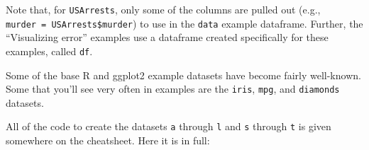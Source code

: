 \documentclass[]{book}
\makeatletter
\newenvironment{kframe}{%
\medskip{}
\setlength{\fboxsep}{.8em}
 \def\at@end@of@kframe{}%
 \ifinner\ifhmode%
  \def\at@end@of@kframe{\end{minipage}}%
  \begin{minipage}{\columnwidth}%
 \fi\fi%
 \def\FrameCommand##1{\hskip\@totalleftmargin \hskip-\fboxsep
 \colorbox{shadecolor}{##1}\hskip-\fboxsep
     \hskip-\linewidth \hskip-\@totalleftmargin \hskip\columnwidth}%
 \MakeFramed {\advance\hsize-\width
   \@totalleftmargin\z@ \linewidth\hsize
   \@setminipage}}%
 {\par\unskip\endMakeFramed%
 \at@end@of@kframe}
\newenvironment{rmdblock}[1]
  {
  \begin{itemize}
  \renewcommand{\labelitemi}{
    \raisebox{-.7\height}[0pt][0pt]{
      {\setkeys{Gin}{width=3em,keepaspectratio}\texttt{[image: images/\#1]}}
    }
  }
  \setlength{\fboxsep}{1em}
  \begin{kframe}
  \item
  }
  {
  \end{kframe}
  \end{itemize}
  }
\newenvironment{rmdnote}
  {\begin{rmdblock}{note}}
  {\end{rmdblock}}
\makeatother
\begin{document}
Note that, for \texttt{USArrests}, only some of the columns are pulled
out (e.g., \texttt{murder\ =\ USArrests\$murder}) to use in the
\texttt{data} example dataframe. Further, the ``Visualizing error''
examples use a dataframe created specifically for these examples, called
\texttt{df}.

\begin{rmdnote}
Some of the base R and ggplot2 example datasets have become fairly
well-known. Some that you'll see very often in examples are the
\texttt{iris}, \texttt{mpg}, and \texttt{diamonds} datasets.
\end{rmdnote}

All of the code to create the datasets \texttt{a} through \texttt{l} and
\texttt{s} through \texttt{t} is given somewhere on the cheatsheet. Here
it is in full:
\end{document}
